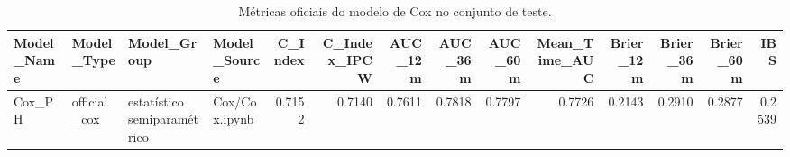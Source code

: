 \begin{table}
\caption{Métricas oficiais do modelo de Cox no conjunto de teste.}
\label{tab:cox_official_metrics}
\begin{tabular}{llllrrrrrrrrrr}
\toprule
Model_Name & Model_Type & Model_Group & Model_Source & C_Index & C_Index_IPCW & AUC_12m & AUC_36m & AUC_60m & Mean_Time_AUC & Brier_12m & Brier_36m & Brier_60m & IBS \\
\midrule
Cox_PH & official_cox & estatístico semiparamétrico & Cox/Cox.ipynb & 0.7152 & 0.7140 & 0.7611 & 0.7818 & 0.7797 & 0.7726 & 0.2143 & 0.2910 & 0.2877 & 0.2539 \\
\bottomrule
\end{tabular}
\end{table}
